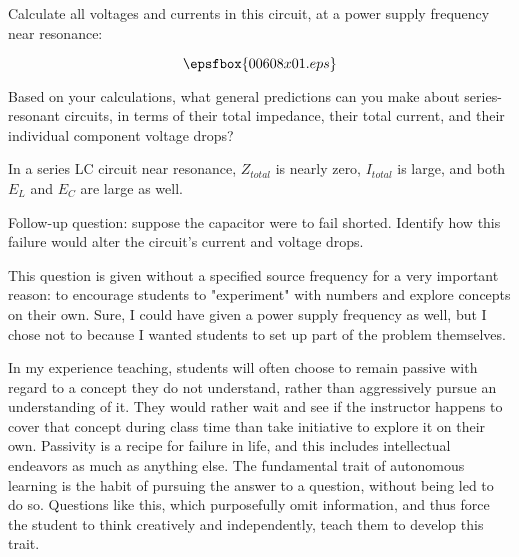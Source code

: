 

Calculate all voltages and currents in this circuit, at a power supply frequency near resonance:

$$\epsfbox{00608x01.eps}$$

Based on your calculations, what general predictions can you make about series-resonant circuits, in terms of their total impedance, their total current, and their individual component voltage drops?







In a series LC circuit near resonance, $Z_{total}$ is nearly zero, $I_{total}$ is large, and both $E_L$ and $E_C$ are large as well.

\vskip 10pt

Follow-up question: suppose the capacitor were to fail shorted.  Identify how this failure would alter the circuit's current and voltage drops.







This question is given without a specified source frequency for a very important reason: to encourage students to "experiment" with numbers and explore concepts on their own.  Sure, I could have given a power supply frequency as well, but I chose not to because I wanted students to set up part of the problem themselves.

In my experience teaching, students will often choose to remain passive with regard to a concept they do not understand, rather than aggressively pursue an understanding of it.  They would rather wait and see if the instructor happens to cover that concept during class time than take initiative to explore it on their own.  Passivity is a recipe for failure in life, and this includes intellectual endeavors as much as anything else.  The fundamental trait of autonomous learning is the habit of pursuing the answer to a question, without being led to do so.  Questions like this, which purposefully omit information, and thus force the student to think creatively and independently, teach them to develop this trait.




